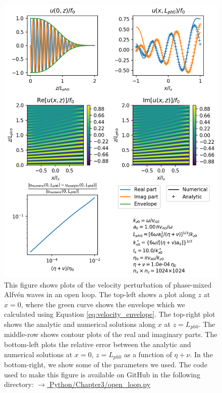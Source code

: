 \begin{figure}
    \centering
    \vspace{-20pt}
    \includegraphics[width=\textwidth,height=0.85\textheight,keepaspectratio]{figures/chapter03/phase_mixing_open_loop.png}
    \vspace{-10pt}
    \caption{This figure shows plots of the velocity perturbation of phase-mixed Alfv\'en waves in an open loop. The top-left shows a plot along $z$ at $x=0$, where the green curve shows the envelope which we calculated using Equation \eqref{eq:velocity_envelope}. The top-right plot shows the analytic and numerical solutions along $x$ at $z=L_{ph0}$. The middle-row shows contour plots of the real and imaginary parts. The bottom-left plots the relative error between the analytic and numerical solutions at $x=0$, $z=L_{ph0}$ as a function of $\eta+\nu$. In the bottom-right, we show some of the parameters we used. The code used to make this figure is available on GitHub in the following directory:\newline
    \href{https://github.com/aleksyprok/apkp_thesis/blob/main/Python/Chapter3/open_loop.py}{$\rightarrow$ Python/Chapter3/open\_loop.py}}
    \vspace{-30pt}
    \label{fig:phase_mxing_open_loop}
\end{figure}


